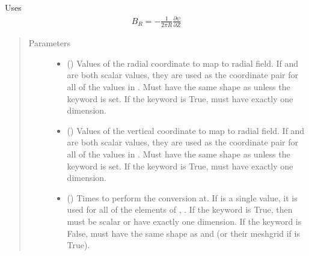 \documentclass[letterpaper,10pt,english]{sphinxmanual}
\begin{document}
\begin{fulllineitems}
\begin{fulllineitems}
Uses
\begin{equation*}
\begin{split}B_R = -\frac{1}{2 \pi R}\frac{\partial \psi}{\partial Z}\end{split}
\end{equation*}\begin{quote}\begin{description}
\item[{Parameters}] \leavevmode\begin{itemize}
\item {} 
 () \textendash{} Values of the radial coordinate to
map to radial field. If  and  are both scalar values,
they are used as the coordinate pair for all of the values in
. Must have the same shape as  unless the 
keyword is set. If the  keyword is True,  must
have exactly one dimension.

\item {} 
 () \textendash{} Values of the vertical coordinate to
map to radial field. If  and  are both scalar values,
they are used as the coordinate pair for all of the values in
. Must have the same shape as  unless the 
keyword is set. If the  keyword is True,  must
have exactly one dimension.

\item {} 
 () \textendash{} Times to perform the conversion at.
If  is a single value, it is used for all of the elements of
, . If the  keyword is True, then  must be
scalar or have exactly one dimension. If the  keyword is
False,  must have the same shape as  and  (or their
meshgrid if  is True).


\end{itemize}
\end{description}
\end{quote}
\end{fulllineitems}
\end{fulllineitems}
\end{document}
